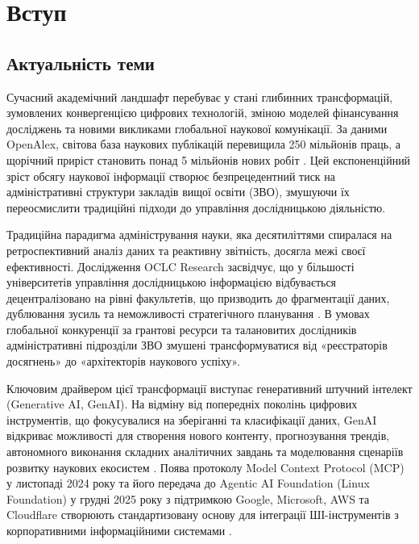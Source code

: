 \section*{Вступ}

\subsection*{Актуальність теми}

Сучасний академічний ландшафт перебуває у стані глибинних трансформацій, зумовлених конвергенцією цифрових технологій, зміною моделей фінансування досліджень та новими викликами глобальної наукової комунікації. За даними OpenAlex, світова база наукових публікацій перевищила 250 мільйонів праць, а щорічний приріст становить понад 5 мільйонів нових робіт \cite{OpenAlex2024Docs}. Цей експоненційний зріст обсягу наукової інформації створює безпрецедентний тиск на адміністративні структури закладів вищої освіти (ЗВО), змушуючи їх переосмислити традиційні підходи до управління дослідницькою діяльністю.

Традиційна парадигма адміністрування науки, яка десятиліттями спиралася на ретроспективний аналіз даних та реактивну звітність, досягла межі своєї ефективності. Дослідження OCLC Research засвідчує, що у більшості університетів управління дослідницькою інформацією відбувається децентралізовано на рівні факультетів, що призводить до фрагментації даних, дублювання зусиль та неможливості стратегічного планування \cite{Bryant2017RIMDefining}. В умовах глобальної конкуренції за грантові ресурси та талановитих дослідників адміністративні підрозділи ЗВО змушені трансформуватися від «реєстраторів досягнень» до «архітекторів наукового успіху».

Ключовим драйвером цієї трансформації виступає генеративний штучний інтелект (Generative AI, GenAI). На відміну від попередніх поколінь цифрових інструментів, що фокусувалися на зберіганні та класифікації даних, GenAI відкриває можливості для створення нового контенту, прогнозування трендів, автономного виконання складних аналітичних завдань та моделювання сценаріїв розвитку наукових екосистем \cite{Wang2024SurveyLLMAgents,Xi2023RisePotentialAgents}. Поява протоколу Model Context Protocol (MCP) у листопаді 2024 року та його передача до Agentic AI Foundation (Linux Foundation) у грудні 2025 року з підтримкою Google, Microsoft, AWS та Cloudflare створюють стандартизовану основу для інтеграції ШІ-інструментів з корпоративними інформаційними системами \cite{Anthropic2024MCP}.

